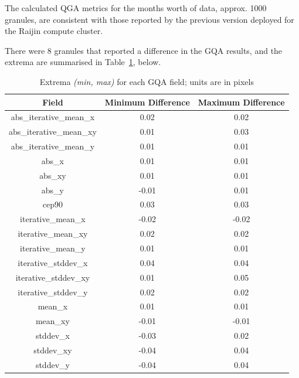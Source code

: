\documentclass[a4paper]{article}
\begin{document}
      \begin{flushleft}
        The calculated QGA metrics for the months worth of data, approx. 1000 granules, are consistent with those reported by the previous version deployed for the Raijin compute cluster. \par
        There were 8 granules that reported a difference in the GQA results, and the extrema are summarised in Table~\ref{table:13}, below.
      \end{flushleft}

      \begin{table}[ht!]
        \caption{Extrema \textit{(min, max)} for each GQA field; units are in pixels}\label{table:13}
        \centering
        \begin{tabular}{ccc} \midrule
          \textbf{Field} & \textbf{Minimum Difference} & \textbf{Maximum Difference} \\ \midrule
          abs\_iterative\_mean\_x & 0.02 & 0.02 \\
          abs\_iterative\_mean\_xy & 0.01 & 0.03 \\
          abs\_iterative\_mean\_y & 0.01 & 0.01 \\
          abs\_x & 0.01 & 0.01 \\
          abs\_xy & 0.01 & 0.01 \\
          abs\_y & -0.01 & 0.01 \\
          cep90 & 0.03 & 0.03 \\
          iterative\_mean\_x & -0.02 & -0.02 \\
          iterative\_mean\_xy & 0.02 & 0.02 \\
          iterative\_mean\_y & 0.01 & 0.01 \\
          iterative\_stddev\_x & 0.04 & 0.04 \\
          iterative\_stddev\_xy & 0.01 & 0.05 \\
          iterative\_stddev\_y & 0.02 & 0.02 \\
          mean\_x & 0.01 & 0.01 \\
          mean\_xy & -0.01 & -0.01 \\
          stddev\_x & -0.03 & 0.02 \\
          stddev\_xy & -0.04 & 0.04 \\
          stddev\_y & -0.04 & 0.04 \\ \midrule
        \end{tabular}
      \end{table}
\end{document}
